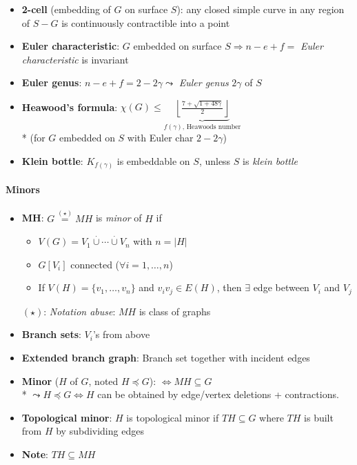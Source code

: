 \begin{itemize}
  \item \textbf{2-cell} (embedding of $ G $ on surface $ S $): any closed simple curve in any region of $ S - G $ is continuously contractible into a point
  \item \textbf{Euler characteristic}: $ G $ embedded on surface $ S \Rightarrow n - e + f = $ \emph{Euler characteristic} is invariant
  \item \textbf{Euler genus}: $ n - e + f = 2 - 2 \gamma \leadsto $ \emph{Euler genus} $ 2 \gamma $ of $ S $
  \item \textbf{Heawood's formula}: $ \chi(G) \leq \underbrace{\left\lfloor \frac{7 + \sqrt{1 + 48 \gamma}}{2} \right\rfloor}_{f(\gamma)\text{, Heawoods number}} $ \\* (for $ G $ embedded on $ S $ with Euler char $ 2-2\gamma $)
  \item \textbf{Klein bottle}: $ K_{f(\gamma)} $ is embeddable on $ S $, unless $ S $ is \emph{klein bottle}
\end{itemize}

\paragraph{Minors}
\begin{itemize}
  \item \textbf{MH}: $ G \overset{(\star)}{=} MH $ is \emph{minor} of $ H $ if
  \begin{itemize}
    \item $ V(G) = V_1 \overset{\cdot}{\cup} \cdots \overset{\cdot}{\cup} V_n $ with $ n = \vert H \vert $
    \item $ G[V_i] $ connected ($ \forall i = 1, \dots, n $)
    \item If $ V(H) = \{ v_1, \dots, v_n \} $ and $ v_iv_j \in E(H) $, then $ \exists $ edge between $ V_i $ and $ V_j $
  \end{itemize}
  $ (\star) $: \emph{Notation abuse}: $ MH $ is class of graphs
  \item \textbf{Branch sets}: $ V_i $'s from above
  \item \textbf{Extended branch graph}: Branch set together with incident edges
  \item \textbf{Minor} ($ H $ of $ G $, noted $ H \preccurlyeq G $): $ \Leftrightarrow MH \subseteq G $ \\*
    $ \leadsto H \preccurlyeq G \Leftrightarrow H $ can be obtained by edge/vertex deletions + contractions.
  \item \textbf{Topological minor}: $ H $ is topological minor if $ TH \subseteq G $ where $ TH $ is built from $ H $ by subdividing edges
  \item \textbf{Note}: $ TH \subseteq MH $
\end{itemize}

